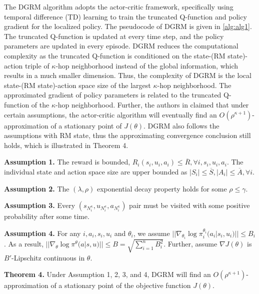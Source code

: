 \documentclass[conf]{new-aiaa}
\def\foo ABC{DGRM}
\begin{document}
The \foo ABC algorithm adopts the actor-critic framework, specifically using temporal difference (TD) learning to train the truncated Q-function and policy gradient for the localized policy. The pseudocode of \foo ABC is given in \cref{alg:alg1}. The truncated Q-function is updated at every time step, and the policy parameters are updated in every episode. \foo ABC reduces the computational complexity as the truncated Q-function is conditioned on the state-(RM state)-action triple of $\kappa$-hop neighborhood instead of the global information, which results in a much smaller dimension. Thus, the complexity of \foo ABC is the local state-(RM state)-action space size of the largest $\kappa$-hop neighborhood. The approximated gradient of policy parameters is related to the truncated Q-function of the $\kappa$-hop neighborhood. Further, the authors in \cite{qu2020scalable} claimed that under certain assumptions, the actor-critic algorithm will eventually find an $O(\rho^{\kappa+1})$-approximation of a stationary point of $J(\theta)$. \foo ABC also follows the assumptions with RM state, thus the approximating convergence conclusion still holds, which is illustrated in Theorem 4.


\textbf{Assumption 1.} The reward is bounded, $R_i(s_i,u_i, a_i) \le \overline{R}, \forall i, s_i, u_i, a_i$. The individual state and action space size are upper bounded as $|S_i| \le \overline{S}, |A_i | \le \overline{A}, \forall i$.

\textbf{Assumption 2.} The $(\lambda, \rho)$ exponential decay property holds for some $\rho \le \gamma$.

\textbf{Assumption 3.} Every $(s_{N_i^\kappa}, u_{N_i^\kappa}, a_{N_i^\kappa})$ pair must be visited with some positive probability after some time.

\textbf{Assumption 4.} For any $i, a_i, s_i, u_i$ and $\theta_i$, we assume $||\nabla_{\theta_i}\log \pi_i^{\theta_i}(a_i|s_i, u_i)|| \le B_i$. As a result, $||\nabla_{\theta}\log \pi^{\theta}(a|s, u)|| \le B = \sqrt{\sum_{i=1}^n B_i^2}$. Further, assume $\nabla J(\theta)$ is $B'$-Lipschitz continuous in $\theta$.

\textbf{Theorem 4.} Under Assumption 1, 2, 3, and 4, \foo ABC will find an $O(\rho^{\kappa+1})$-approximation of a stationary point of the objective function $J(\theta)$.
\end{document}
